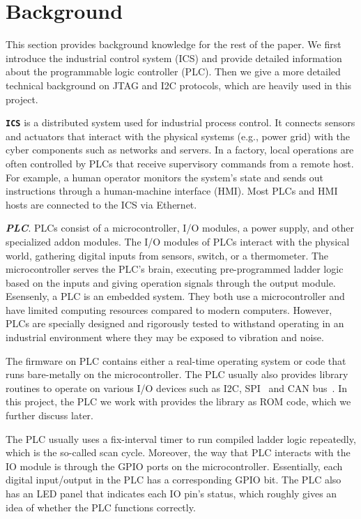 \section{Background}
\label{sec:implant-background}

This section provides background knowledge for the rest of the paper. We first introduce the industrial control system (ICS) and provide detailed information about the programmable logic controller (PLC). Then we give a more detailed technical background on JTAG and I2C protocols, which are heavily used in this project.

\textbf{\texttt{ICS}} is a distributed system used for industrial process control. It connects sensors and actuators that interact with the physical systems (e.g., power grid) with the cyber components such as networks and servers. In a factory, local operations are often controlled by PLCs that receive supervisory commands from a remote host. For example, a human operator monitors the system's state and sends out instructions through a human-machine interface (HMI). Most PLCs and HMI hosts are connected to the ICS via Ethernet.

\textbf{\textit{PLC}}. PLCs consist of a microcontroller, I/O modules, a power supply, and other specialized addon modules. The I/O modules of PLCs interact with the physical world, gathering digital inputs from sensors, switch, or a thermometer. The microcontroller serves the PLC's brain, executing pre-programmed ladder logic based on the inputs and giving operation signals through the output module. Esensenly, a PLC is an embedded system. They both use a microcontroller and have limited computing resources compared to modern computers. However, PLCs are specially designed and rigorously tested to withstand operating in an industrial environment where they may be exposed to vibration and noise.

The firmware on PLC contains either a real-time operating system or code that runs bare-metally on the microcontroller. The PLC usually also provides library routines to operate on various I/O devices such as I2C, SPI~\cite{leens2009introduction} and CAN bus~\cite{bozdal2018survey}. In this project, the PLC we work with provides the library as ROM code, which we further discuss later. 

The PLC usually uses a fix-interval timer to run compiled ladder logic repeatedly, which is the so-called scan cycle. Moreover, the way that PLC interacts with the IO module is through the GPIO ports on the microcontroller. Essentially, each digital input/output in the PLC has a corresponding GPIO bit. The PLC also has an LED panel that indicates each IO pin's status, which roughly gives an idea of whether the PLC functions correctly.


